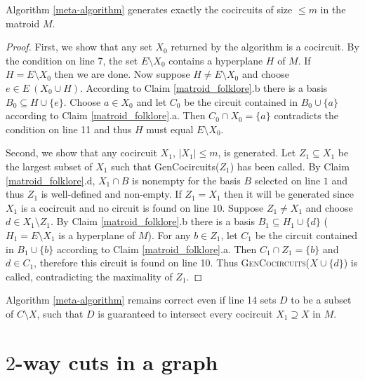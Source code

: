 \begin{thm}
	\label{meta_alg_correctness}
	Algorithm \ref{meta-algorithm} generates exactly the cocircuits of size $\leq m$ in the matroid $M$.
\end{thm}

\begin{proof}
	First, we show that any set $X_0$ returned by the algorithm is a cocircuit. By the condition on line 7, the set $E \setminus X_0$ contains a hyperplane $H$ of $M$. If $H = E \setminus X_0$ then we are done. Now suppose $H \neq E \setminus X_0$ and choose $e \in E \ (X_0 \cup H)$. According to Claim \ref{matroid_folklore}.b there is a basis $B_0 \subseteq H \cup \{e\}$. Choose $a \in X_0$ and let $C_0$ be the circuit contained in $B_0 \cup \{a\}$ according to Claim \ref{matroid_folklore}.a. Then $C_0 \cap X_0 = \{a\}$ contradicts the condition on line 11 and thus $H$ must equal $E \setminus X_0$.

	Second, we show that any cocircuit $X_1$, $\lvert X_1 \rvert \leq m$, is generated. Let $Z_1 \subseteq X_1$ be the largest subset of $X_1$ such that GenCocircuits($Z_1$) has been called. By Claim \ref{matroid_folklore}.d, $X_1 \cap B$ is nonempty for the basis $B$ \linebreak selected on line $1$ and thus $Z_1$ is well-defined and non-empty. \linebreak If $Z_1 = X_1$ then it will be generated since $X_1$ is a cocircuit and no circuit is found on line $10$. Suppose $Z_1 \neq X_1$ and choose $d \in X_1 \setminus Z_1$. By Claim \ref{matroid_folklore}.b there is a basis $B_1 \subseteq H_1 \cup \{d\}$ ($H_1 = E \setminus X_1$ is a hyperplane of $M$). For any $b \in Z_1$, let $C_1$ be the circuit contained in $B_1 \cup \{b\}$ according to Claim \ref{matroid_folklore}.a. Then $C_1 \cap Z_1 = \{b\}$ and $d \in C_1$, therefore this circuit is found on line 10. Thus \textsc{GenCocircuits}($X \cup \{d\}$) is called, contradicting the maximality of $Z_1$.
\end{proof}

\begin{cor}
	\label{cor_circuit_subset}
	Algorithm \ref{meta-algorithm} remains correct even if line 14 sets $D$ to be a subset of $C \setminus X$, such that $D$ is guaranteed to intersect every cocircuit $X_1 \supseteq X$ in $M$.
\end{cor}

\section{$2$-way cuts in a graph}

